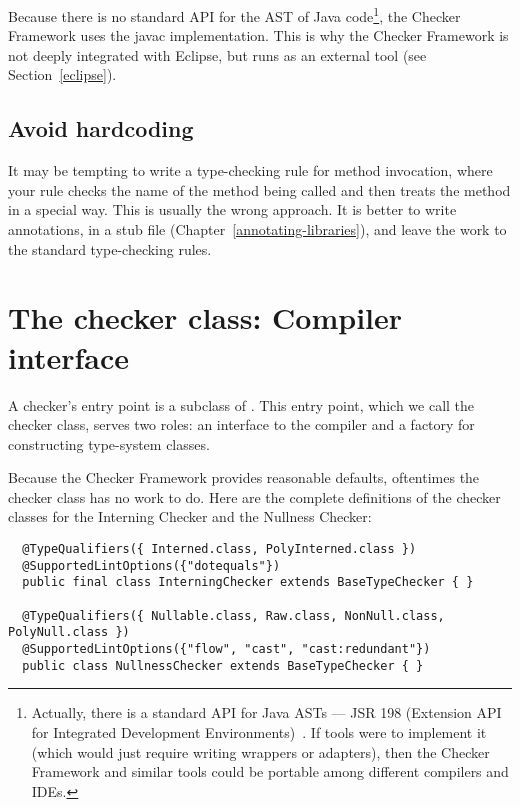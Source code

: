 Because there is no standard API for the AST of Java code\footnote{Actually,
there is a standard API for Java ASTs --- JSR 198 (Extension API for
Integrated Development Environments)~\cite{JSR198}.  If tools were to
implement it
(which would just require writing wrappers or adapters), then the Checker
Framework and similar tools could be portable among different compilers and
IDEs.}, the Checker
Framework uses the javac implementation.  This is why the Checker Framework
is not deeply integrated with Eclipse, but runs as an external tool (see
Section~\ref{eclipse}).


\subsection{Avoid hardcoding\label{avoid-hardcoding}}

It may be tempting to write a type-checking rule for method invocation,
where your rule checks the name of the method being called and then treats
the method in a special way.  This is usually the wrong approach.  It
is better to write annotations, in a stub file
(Chapter~\ref{annotating-libraries}), and leave the work to the standard
type-checking rules.


\section{The checker class:  Compiler interface\label{writing-compiler-interface}}

A checker's entry point is a subclass of .  This entry
point, which we call the checker class, serves two
roles:  an interface to the compiler and a factory for constructing
type-system classes.

Because the Checker Framework provides reasonable defaults, oftentimes the
checker class has no work to do.  Here are the complete definitions of the
checker classes for the Interning Checker and the Nullness Checker:

\begin{Verbatim}
  @TypeQualifiers({ Interned.class, PolyInterned.class })
  @SupportedLintOptions({"dotequals"})
  public final class InterningChecker extends BaseTypeChecker { }

  @TypeQualifiers({ Nullable.class, Raw.class, NonNull.class, PolyNull.class })
  @SupportedLintOptions({"flow", "cast", "cast:redundant"})
  public class NullnessChecker extends BaseTypeChecker { }
\end{Verbatim}


